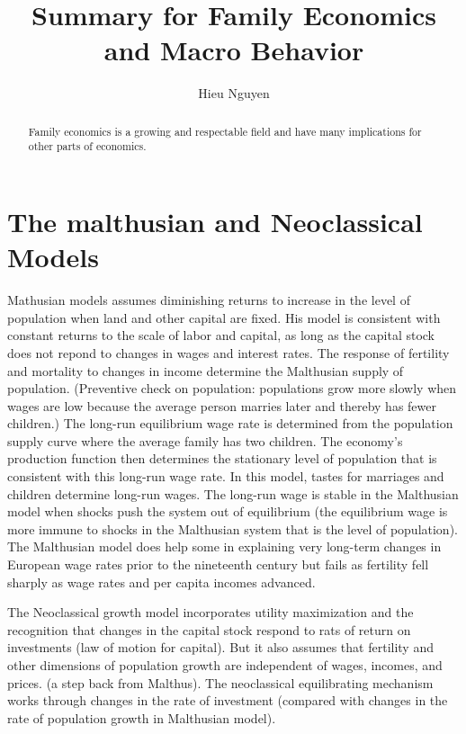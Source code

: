 \documentclass[11pt]{article}
\begin{document}
\title{Summary for Family Economics and Macro Behavior}
\author{Hieu Nguyen}



\maketitle
\begin{abstract}
Family economics is a growing and respectable field and have many implications for other parts of economics. 
\end{abstract}




\section{The malthusian and Neoclassical Models}
\indent Mathusian models assumes diminishing returns to increase in the level of population when land and other capital are fixed. His model is consistent with constant returns to the scale of labor and capital, as long as the capital stock does not repond to changes in wages and interest rates. The response of fertility and mortality to changes in income determine the Malthusian supply of population. (Preventive check on population: populations grow more slowly when wages are low because the average person marries later and thereby has fewer children.) The long-run equilibrium wage rate is determined from the population supply curve where the average family has two children. The economy's production function then determines the stationary level of population that is consistent with this long-run wage rate. In this model, tastes for marriages and children determine long-run wages. The long-run wage is stable in the Malthusian model when shocks push the system out of equilibrium (the equilibrium wage is more immune to shocks in the Malthusian system that is the level of population). The Malthusian model does help some in explaining very long-term changes in European wage rates prior to the nineteenth century but fails as fertility fell sharply as wage rates and per capita incomes advanced. 

\indent The Neoclassical growth model incorporates utility maximization and the recognition that changes in the capital stock respond to rats of return on investments (law of motion for capital). But it also assumes that fertility and other dimensions of population growth are independent of wages, incomes, and prices. (a step back from Malthus). The neoclassical equilibrating mechanism works through changes in the rate of investment (compared with changes in the rate of population growth in Malthusian model).
\end{document}
